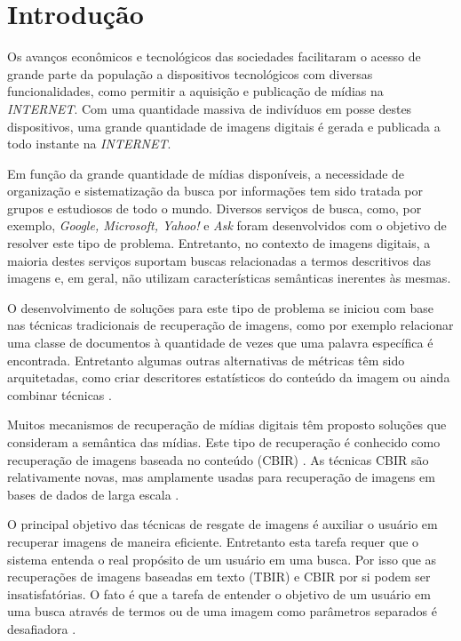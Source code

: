                                                                                                                                                                                                                                       
\chapter[Introdução]{Introdução}

Os avanços econômicos e tecnológicos das sociedades  facilitaram o acesso de grande parte da população a dispositivos tecnológicos com diversas funcionalidades, como permitir a aquisição e publicação de mídias na \emph{INTERNET}. Com uma quantidade massiva de indivíduos em posse destes dispositivos, uma grande quantidade de imagens digitais é gerada e publicada a todo instante na \emph{INTERNET}.

Em função da grande quantidade de mídias disponíveis, a necessidade de organização e sistematização da busca por informações tem sido tratada por grupos e estudiosos de todo o mundo. Diversos serviços de busca, como, por exemplo,  \emph{Google, Microsoft, Yahoo!} e \emph{Ask} foram desenvolvidos com o objetivo de resolver este tipo de problema. Entretanto, no contexto de imagens digitais, a maioria destes serviços suportam buscas relacionadas a termos descritivos das imagens e, em geral, não utilizam  características semânticas inerentes às mesmas.

O desenvolvimento de soluções para este tipo de problema se iniciou com base nas técnicas tradicionais de recuperação de imagens, como por exemplo relacionar uma classe de documentos à quantidade de vezes que uma palavra específica é encontrada. Entretanto algumas outras alternativas de métricas têm sido arquitetadas, como criar descritores estatísticos do conteúdo da imagem ou ainda combinar técnicas \cite{fundamentalsofmultimedia}.

Muitos mecanismos de recuperação de mídias digitais têm proposto soluções que consideram a semântica das mídias. Este tipo de recuperação é conhecido como recuperação de imagens baseada no conteúdo (CBIR) \cite{eakins}. As técnicas CBIR são relativamente novas, mas amplamente usadas para recuperação de imagens em bases de dados de larga escala \cite{jain2011survey}.

O principal objetivo das técnicas de resgate de imagens é auxiliar o usuário em recuperar imagens de maneira eficiente. Entretanto esta tarefa requer que o sistema entenda o real propósito de um usuário em uma busca. Por isso que as recuperações de imagens baseadas em texto (TBIR) e CBIR por si podem ser insatisfatórias. O fato é que a tarefa de entender o objetivo de um usuário em uma busca através de termos ou de uma imagem como parâmetros separados é desafiadora \cite{hartvedt2010using}. 

